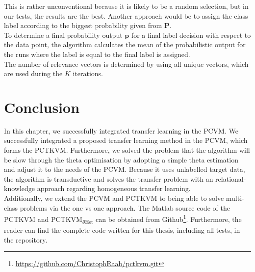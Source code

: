 This is rather unconventional because it is likely to be a random selection, but in our tests, the results are the best.
Another approach would be to assign the class label according to the biggest probability given from $\mathbf{P}$.\\
To determine a final probability output $\mathbf{p}$ for a final label decision with respect to the data point, the algorithm calculates the mean of the probabilistic output for the runs where the label is equal to the final label is assigned.\\
The number of relevance vectors is determined by using all unique vectors, which are used during the $K$ iterations.

\section{Conclusion}\label{InSecCon}
In this chapter, we successfully integrated transfer learning in the \acs{PCVM}.
We successfully integrated a proposed transfer learning method in the \acs{PCVM}, which forms the \acs{PCTKVM}.
Furthermore, we solved the problem that the algorithm will be slow through the theta optimisation by adopting a simple theta estimation and adjust it to the needs of the \acs{PCVM}.
Because it uses unlabelled target data, the algorithm is transductive and solves the transfer problem with an relational-knowledge approach regarding homogeneous transfer learning.\\
Additionally, we extend the \acs{PCVM} and \acs{PCTKVM} to being able to solve multi-class problems via the one vs one approach.
The Matlab source code of the \acs{PCTKVM} and \acs{PCTKVM}\textsubscript{$\theta$Est} can be obtained from Github\footnote{\url{https://github.com/ChristophRaab/pctkvm.git}}.
Furthermore, the reader can find the complete code written for this thesis, including all tests, in the repository.
